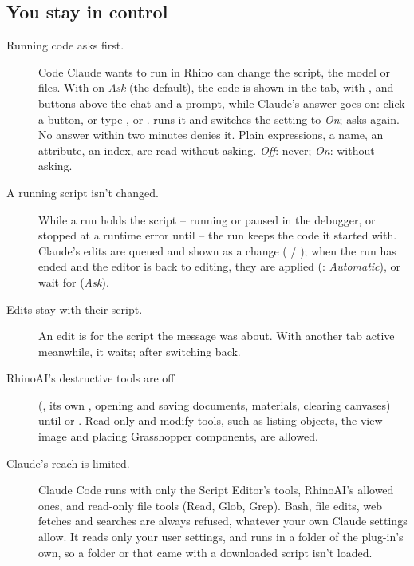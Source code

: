 \subsection{You stay in control}

\begin{description}
  \item[Running code asks first.] Code Claude wants to run in Rhino can change the script, the model or files.
        With  on \emph{Ask} (the default), the code is shown in the tab, with
        ,  and  buttons above the chat and a \code{> } prompt, while Claude's answer goes on: click a
        button, or type ,  or .  runs it and switches the setting to \emph{On};
         asks again. No answer within two minutes denies it. Plain expressions, a name,
        an attribute, an index, are read without asking. \emph{Off}: never; \emph{On}: without asking.
  \item[A running script isn't changed.] While a run holds the script -- running or paused in the debugger, or
        stopped at a runtime error until  -- the run keeps the code it started with. Claude's edits are queued
        and shown as a change ( / ); when the run has ended and the editor is back to editing, they are applied
        (: \emph{Automatic}), or wait for  (\emph{Ask}).
  \item[Edits stay with their script.] An edit is for the script the message was about. With another tab
        active meanwhile, it waits;  after switching back.
  \item[RhinoAI's destructive tools are off] (, its own , opening and saving documents,
        materials, clearing canvases) until  or .
        Read-only and modify tools, such as listing objects, the view image and placing Grasshopper components,
        are allowed.
  \item[Claude's reach is limited.] Claude Code runs with only the Script Editor's tools, RhinoAI's allowed ones,
        and read-only file tools (Read, Glob, Grep). Bash, file edits, web fetches and searches are always refused,
        whatever your own Claude settings allow. It reads only your user settings, and runs in a folder of the
        plug-in's own, so a  folder or  that came with a downloaded script isn't loaded.
\end{description}

